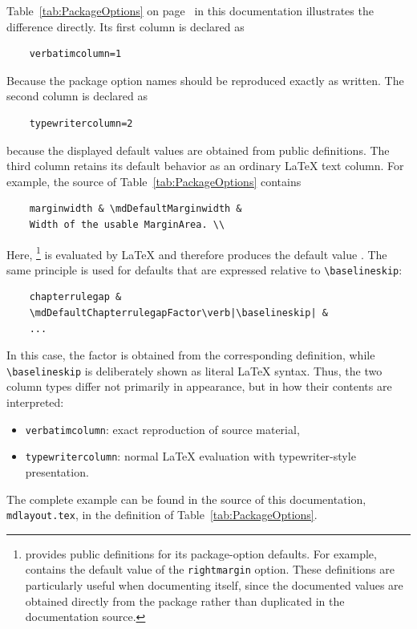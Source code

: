 \documentclass[
11pt,
a4paper,
oneside
]{scrbook}
\begin{document}
{Table~\ref{tab:PackageOptions} on page~\pageref{tab:PackageOptions}
in this documentation illustrates the difference directly. 
Its first column is declared as
\begin{verbatim}
	verbatimcolumn=1
\end{verbatim}
Because the package option names should be reproduced exactly as written.
The second column is declared as
\begin{verbatim}
	typewritercolumn=2
\end{verbatim}
because the displayed default values are obtained from public
\mdlayout{} definitions. The third column retains its default behavior as an ordinary
\LaTeX{} text column. For example, the source of
Table~\ref{tab:PackageOptions} contains
\begin{verbatim}
	marginwidth & \mdDefaultMarginwidth &
	Width of the usable MarginArea. \\
\end{verbatim}
Here, \texttt{\string\mdDefaultRightmargin}\footnote{%
	\mdlayout{} provides public definitions for its package-option
	defaults. For example, \texttt{\string\mdDefaultRightmargin}
	contains the default value of the \texttt{rightmargin} option.
	These definitions are particularly useful when documenting
	\mdlayout{} itself, since the documented values are obtained
	directly from the package rather than duplicated in the
	documentation source.%
}
is evaluated by \LaTeX{} and therefore produces the default value
\texttt{\mdDefaultRightmargin}.
The same principle is used for defaults that are expressed relative to
\verb|\baselineskip|:
\begin{verbatim}
	chapterrulegap &
	\mdDefaultChapterrulegapFactor\verb|\baselineskip| &
	...
\end{verbatim}
In this case, the factor is obtained from the corresponding
\mdlayout{} definition, while \verb|\baselineskip| is deliberately
shown as literal \LaTeX{} syntax.
Thus, the two column types differ not primarily in appearance, but in
how their contents are interpreted:
\begin{itemize}
	\item \texttt{verbatimcolumn}: exact reproduction of source material,
	\item \texttt{typewritercolumn}: normal \LaTeX{} evaluation with
	typewriter-style presentation.
\end{itemize}
The complete example can be found in the source of this documentation,
\texttt{mdlayout.tex}, in the definition of
Table~\ref{tab:PackageOptions}.

}
\end{document}
